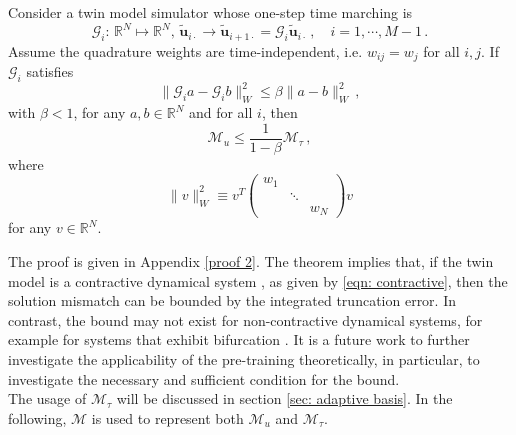 \begin{theorem}
    Consider a twin model simulator whose one-step time marching is
    \begin{equation}
        \mathcal{G}_i:\, \mathbb{R}^N\mapsto\mathbb{R}^N,\, \tilde{\boldsymbol{u}}_{i\cdot}\rightarrow 
        \tilde{\boldsymbol{u}}_{i+1\cdot}=\mathcal{G}_i
        \tilde{\boldsymbol{u}}_{i\cdot} \,,\quad i=1,\cdots, M-1\,.
    \end{equation}
    Assume the quadrature weights are time-independent, i.e.
    $w_{ij} = w_{j}$ for all $i,j$.
    If $\mathcal{G}_i$ satisfies
    \begin{equation}
        \|\mathcal{G}_ia-\mathcal{G}_ib\|^2_{W} \le \beta \|a-b\|^2_{W} \,,
        \label{eqn: contractive}
    \end{equation}
    with $\beta<1$,
    for any $a, b \in \mathbb{R}^N$ and for all $i$,
    then 
    \begin{equation}
        \mathcal{M}_u \le \frac{1}{1-\beta} \mathcal{M}_{\tau}\,,
    \end{equation}
    where
    \begin{equation}
        \|v\|^2_{W} \equiv v^T 
            \begin{pmatrix}
                {w_{1}} && \\
                & \ddots & \\
                && {w_{N}}
            \end{pmatrix} v
    \end{equation}
    for any $v\in \mathbb{R}^N$.
    \label{theorem: 2}
\end{theorem}
The proof is given in Appendix \ref{proof 2}. The theorem implies that,
if the twin model is a contractive dynamical 
system \cite{contractive system}, as given by \eqref{eqn: contractive}, then the
solution mismatch can be bounded by the integrated truncation error. In contrast, 
the bound may not exist for non-contractive dynamical systems, for example for systems 
that exhibit bifurcation \cite{dynamical system}. It is a future work to further investigate the applicability of the pre-training
theoretically, in particular, to investigate the necessary and sufficient condition for the bound.\\

The usage of $\mathcal{M}_{\tau}$ will be discussed in section 
\ref{sec: adaptive basis}. In the following, $\mathcal{M}$ is used to represent both $\mathcal{M}_u$
and $\mathcal{M}_{\tau}$.\\


